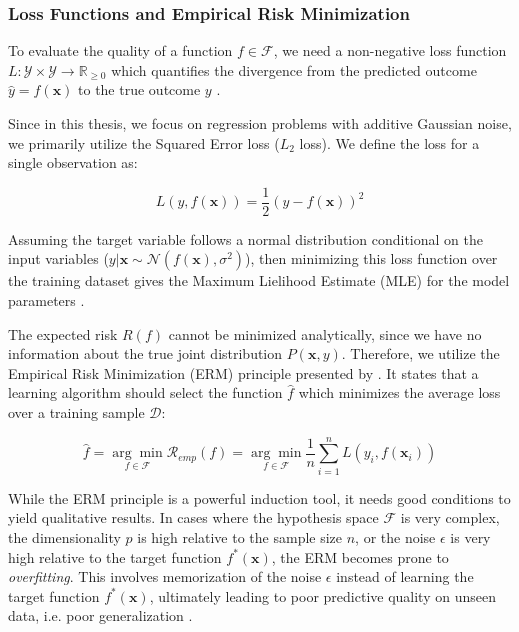 \documentclass[fontsize=12 pt]{scrartcl}
\begin{document}
\subsubsection{Loss Functions and Empirical Risk Minimization}

To evaluate the quality of a function $f \in \mathcal{F}$, we need a non-negative loss function $L: \mathcal{Y} \times \mathcal{Y} \rightarrow \mathbb{R}_{\geq 0}$ which quantifies the divergence from the predicted outcome $\hat{y} = f(\mathbf{x})$ to the true outcome $y$ \citep{hastie2009elements}.

Since in this thesis, we focus on regression problems with additive Gaussian noise, we primarily utilize the Squared Error loss ($L_2$ loss). We define the loss for a single observation as:

\begin{equation}
    L(y, f(\mathbf{x})) = \frac{1}{2} (y - f(\mathbf{x}))^2
\end{equation}

 Assuming the target variable follows a normal distribution conditional on the input variables ($y | \mathbf{x} \sim \mathcal{N}(f(\mathbf{x}), \sigma^2)$), then minimizing this loss function over the training dataset gives the Maximum Lielihood Estimate (MLE) for the model parameters \citep{bishop2006pattern}.

The expected risk $R(f)$ cannot be minimized analytically, since we have no information about the true joint distribution $P(\mathbf{x}, y)$. Therefore, we utilize the Empirical Risk Minimization (ERM) principle presented by \citet{vapnik1998statistical}. It states that a learning algorithm should select the function $\hat{f}$ which minimizes the average loss over a training sample $\mathcal{D}$:

\begin{equation}
    \hat{f} = \underset{f \in \mathcal{F}}{\arg \min} \mathcal{R}_{emp}(f) = \underset{f \in \mathcal{F}}{\arg \min} \frac{1}{n} \sum_{i=1}^n L(y_i, f(\mathbf{x}_i))
\end{equation}

While the ERM principle is a powerful induction tool, it needs good conditions to yield qualitative results. In cases where the hypothesis space $\mathcal{F}$ is very complex, the dimensionality $p$ is high relative to the sample size $n$, or the noise $\epsilon$ is very high relative to the target function $f^*(\mathbf{x})$, the ERM becomes prone to \textit{overfitting}. This involves memorization of the noise $\epsilon$ instead of learning the target function $f^*(\mathbf{x})$, ultimately leading to poor predictive quality on unseen data, i.e. poor generalization \citep{mohri2018foundations}.
\end{document}

